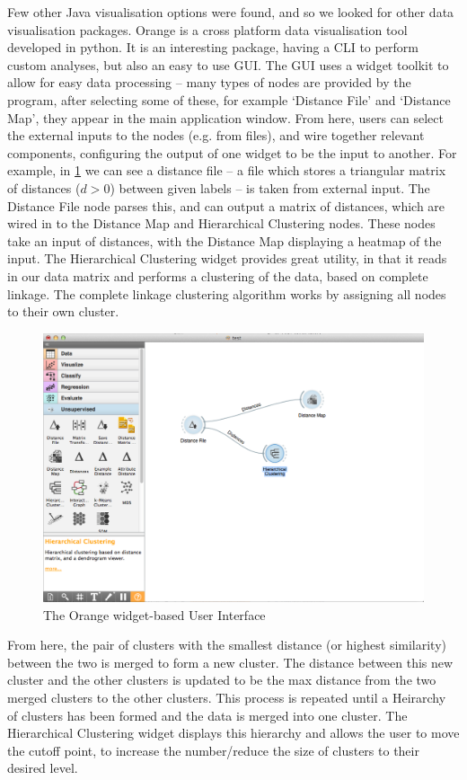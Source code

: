 Few other Java visualisation options were found, and so we looked for other
data visualisation packages. Orange \cite{orange} is a cross platform data
visualisation tool developed in python. It is an interesting package, having
a CLI to perform custom analyses, but also an easy to use GUI. The GUI uses
a widget toolkit to allow for easy data processing -- many types of nodes
are provided by the program, after selecting some of these, for example `Distance
File' and `Distance Map', they appear in the main application window. From here,
users can select the external inputs to the nodes (e.g. from files), and wire
together relevant components, configuring the output of one widget to be the
input to another. For example, in \cref{fig:orangeUI} we can see a distance file
-- a file which stores a triangular matrix of distances ($d>0$) between given labels --
is taken from external input. The Distance File node parses this, and can output
a matrix of distances, which are wired in to the Distance Map and Hierarchical Clustering
nodes. These nodes take an input of distances, with the Distance Map displaying a heatmap
of the input. The Hierarchical Clustering widget provides great utility, in that
it reads in our data matrix and performs a clustering of the data, based on
complete linkage. The complete linkage clustering algorithm works by assigning
all nodes to their own cluster. 
\begin{figure}[H]
	\centering
		\includegraphics[width=\textwidth]{Figures/OrangeUI}
	\caption{The Orange widget-based User Interface}
	\label{fig:orangeUI}
\end{figure}
From here, the pair of clusters with the smallest
distance (or highest similarity) between the two is merged to form a new cluster.
The distance between this new cluster and the other clusters is updated to be
the max distance from the two merged clusters to the other clusters. This process
is repeated until a Heirarchy of clusters has been formed and the data is merged
into one cluster. The Hierarchical Clustering widget displays this hierarchy
and allows the user to move the cutoff point, to increase the number/reduce the
size of clusters to their desired level.


